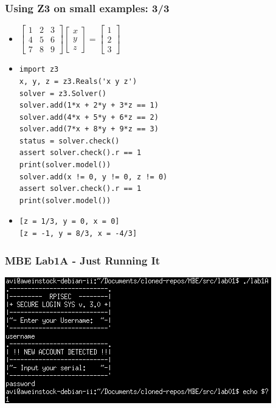\documentclass[aspectratio=169]{beamer}
\begin{document}
\begin{frame}[fragile]
\frametitle{Using Z3 on small examples: 3/3}
\begin{itemize}
\item 
\(
\left[\begin{matrix}
1 & 2 & 3\\
4 & 5 & 6\\
7 & 8 & 9
\end{matrix}\right] 
\left[\begin{matrix}
x\\y\\z
\end{matrix}\right] 
 = \left[\begin{matrix}
1\\2\\3
\end{matrix}\right]
\)
\item \begin{Verbatim}[fontsize=\scriptsize, frame=single]
import z3
x, y, z = z3.Reals('x y z')
solver = z3.Solver()
solver.add(1*x + 2*y + 3*z == 1)
solver.add(4*x + 5*y + 6*z == 2)
solver.add(7*x + 8*y + 9*z == 3)
status = solver.check()
assert solver.check().r == 1
print(solver.model())
solver.add(x != 0, y != 0, z != 0)
assert solver.check().r == 1
print(solver.model())
\end{Verbatim}
\item \begin{Verbatim}[fontsize=\scriptsize, frame=single]
[z = 1/3, y = 0, x = 0]
[z = -1, y = 8/3, x = -4/3]
\end{Verbatim}
\end{itemize}
\end{frame}

\begin{frame}[fragile]
\frametitle{MBE Lab1A - Just Running It}
\includegraphics[width=0.9\paperwidth]{pictures/mbe_lab1a_dynamic_fail_cropped.png}
\end{frame}
\end{document}
